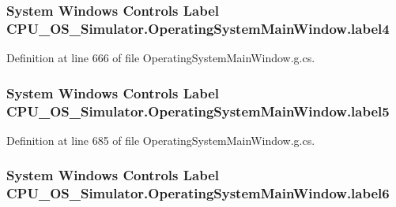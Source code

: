 \subsubsection[{label4}]{\setlength{\rightskip}{0pt plus 5cm}System Windows Controls Label C\+P\+U\+\_\+\+O\+S\+\_\+\+Simulator.\+Operating\+System\+Main\+Window.\+label4\hspace{0.3cm}{\ttfamily [package]}}\label{class_c_p_u___o_s___simulator_1_1_operating_system_main_window_a11f07634242ba2c38b23b293dcd3843e}


Definition at line 666 of file Operating\+System\+Main\+Window.\+g.\+cs.

\hypertarget{class_c_p_u___o_s___simulator_1_1_operating_system_main_window_a2b7721f6cfb0a1eeb4a0aec34ef543c0}{}
\subsubsection[{label5}]{\setlength{\rightskip}{0pt plus 5cm}System Windows Controls Label C\+P\+U\+\_\+\+O\+S\+\_\+\+Simulator.\+Operating\+System\+Main\+Window.\+label5\hspace{0.3cm}{\ttfamily [package]}}\label{class_c_p_u___o_s___simulator_1_1_operating_system_main_window_a2b7721f6cfb0a1eeb4a0aec34ef543c0}


Definition at line 685 of file Operating\+System\+Main\+Window.\+g.\+cs.

\hypertarget{class_c_p_u___o_s___simulator_1_1_operating_system_main_window_ad753667e4d67f79b83e59dc8be4df684}{}
\subsubsection[{label6}]{\setlength{\rightskip}{0pt plus 5cm}System Windows Controls Label C\+P\+U\+\_\+\+O\+S\+\_\+\+Simulator.\+Operating\+System\+Main\+Window.\+label6\hspace{0.3cm}{\ttfamily [package]}}\label{class_c_p_u___o_s___simulator_1_1_operating_system_main_window_ad753667e4d67f79b83e59dc8be4df684}


